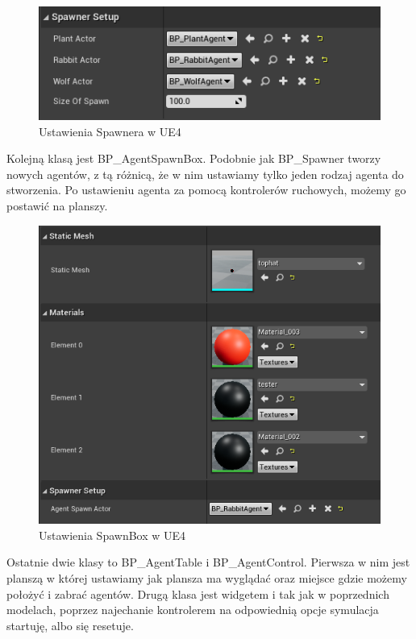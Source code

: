 \documentclass[a4paper,12pt,reqno]{article}
\begin{document}
\begin{figure}[H]%
\centering
\includegraphics[width=0.6\columnwidth]{graphics//agent/BP_SpawnerAgent.png}
\caption{Ustawienia Spawnera w UE4 
\label{BPExample}}%
%
\qquad
\end{figure} 

Kolejną klasą jest BP\_AgentSpawnBox. Podobnie jak BP\_Spawner tworzy nowych agentów, z tą różnicą, że w nim ustawiamy tylko jeden rodzaj agenta do stworzenia. Po ustawieniu agenta za pomocą kontrolerów ruchowych, możemy go postawić na planszy.

\begin{figure}[H]%
\centering
\includegraphics[width=0.50\columnwidth]{graphics//agent/BP_AgentSpawnBox.png}
\caption{Ustawienia SpawnBox w UE4 
\label{BPExample}}%
%
\qquad
\end{figure} 

Ostatnie dwie klasy to BP\_AgentTable i BP\_AgentControl. Pierwsza w nim jest planszą w której ustawiamy jak plansza ma wyglądać oraz miejsce gdzie możemy położyć i zabrać agentów. Drugą klasa jest widgetem i tak jak w poprzednich modelach, poprzez najechanie kontrolerem na odpowiednią opcje symulacja startuję, albo się resetuje.
\end{document}
